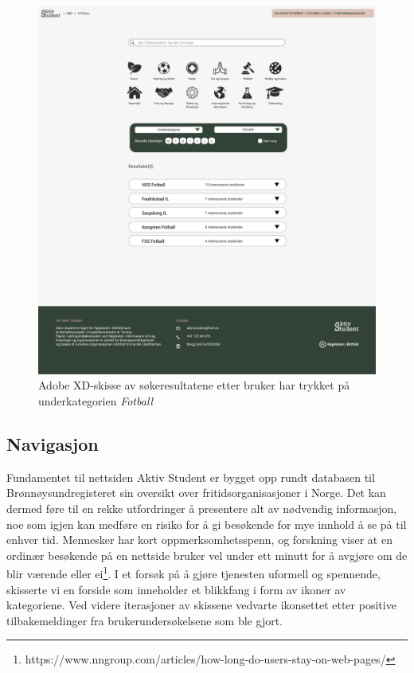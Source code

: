 \begin{figure}[H]
\centering
\includegraphics[width=.7\textwidth]{Illustrasjoner/Skisser-pdf/3.0/3-3-resultater-fotball.pdf}
\caption{Adobe XD-skisse av søkeresultatene etter bruker har trykket på underkategorien {\em Fotball}}
\label{fig:3-3-resultater-filtrering}
\end{figure}

\newpage
\subsection{Navigasjon}

Fundamentet til nettsiden Aktiv Student er bygget opp rundt databasen til Brønnøysundregisteret sin oversikt over fritidsorganisasjoner i Norge. Det kan dermed føre til en rekke utfordringer å presentere alt av nødvendig informasjon, noe som igjen kan medføre en risiko for å gi besøkende for mye innhold å se på til enhver tid.
\vspace{5mm}
Mennesker har kort oppmerksomhetsspenn, og forskning viser at en ordinær besøkende på en nettside bruker vel under ett minutt for å avgjøre om de blir værende eller ei\footnote{https://www.nngroup.com/articles/how-long-do-users-stay-on-web-pages/}. I et forsøk på å gjøre tjenesten uformell og spennende, skisserte vi en forside som inneholder et blikkfang i form av ikoner av kategoriene. Ved videre iterasjoner av skissene vedvarte ikonsettet etter positive tilbakemeldinger fra brukerundersøkelsene som ble gjort.

